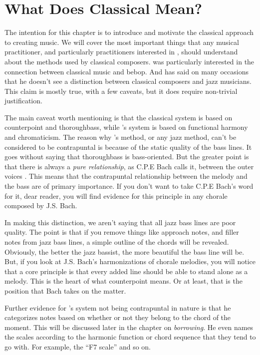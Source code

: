 \section{What Does Classical Mean?}

The intention for this chapter is to introduce and motivate the classical approach to creating music. We will cover the most important things that any musical practitioner, and particularly practitioners interested in \BarryFull, should understand about the methods used by classical composers. \Barry was particularly interested in the connection between classical music and bebop. And has said on many occasions that he doesn't see a distinction between classical composers and jazz musicians. This claim is mostly true, with a few caveats, but it does require non-trivial justification.

The main caveat worth mentioning is that the classical system is based on counterpoint and thoroughbass, while \Barry's system is based on functional harmony and chromaticism. The reason why \Barry's method, or any jazz method, can't be considered to be contrapuntal is because of the static quality of the bass lines. It goes without saying that thoroughbass is bass-oriented. But the greater point is that there is always a \emph{pure relationship}, as C.P.E Bach calls it, between the outer voices \parencite[pg. 177, par. 38]{cpeEssay}. This means that the contrapuntal relationship between the melody and the bass are of primary importance. If you don't want to take C.P.E Bach's word for it, dear reader, you will find evidence for this principle in any chorale composed by J.S. Bach.


In making this distinction, we aren't saying that all jazz bass lines are poor quality. The point is that if you remove things like approach notes, and filler notes from jazz bass lines, a simple outline of the chords will be revealed. Obviously, the better the jazz bassist, the more beautiful the bass line will be. But, if you look at J.S. Bach's harmonizations of chorale melodies, you will notice that a core principle is that every added line should be able to stand alone as a melody. This is the heart of what counterpoint means. Or at least, that is the position that Bach takes on the matter.


Further evidence for \Barry's system not being contrapuntal in nature is that he categorizes notes based on whether or not they belong to the chord of the moment. This will be discussed later in the chapter on \emph{borrowing}. He even names the scales according to the harmonic function or chord sequence that they tend to go with. For example, the ``F7 scale'' and so on.

